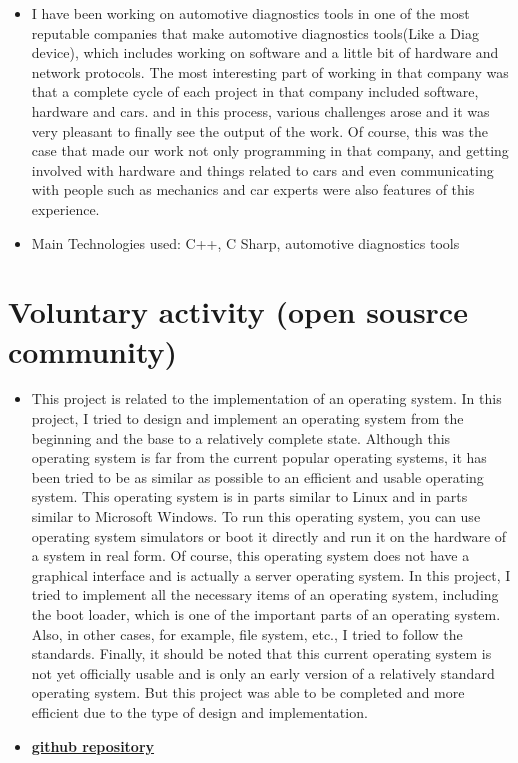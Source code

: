 \documentclass[11pt,a4paper,roman]{moderncv}
\begin{document}
{
{\begin{itemize}
  \item  I have been working on automotive diagnostics tools in one of the most reputable companies that make automotive diagnostics tools(Like a Diag device), which includes working on software and a little bit of hardware and network protocols.
  The most interesting part of working in that company was that a complete cycle of each project in that company included software, hardware and cars. and in this process, various challenges arose and it was very pleasant to finally see the output of the work.
Of course, this was the case that made our work not only programming in that company, and getting involved with hardware and things related to cars and even communicating with people such as mechanics and car experts were also features of this experience.
\item Main  Technologies used: C++, C Sharp, automotive diagnostics tools
\end{itemize}
}
}



\section{Voluntary activity (open sousrce community)}

{
{\begin{itemize}
  \item  This project is related to the implementation of an operating system.
  In this project, I tried to design and implement an operating system from the beginning and the base to a relatively complete state. Although this operating system is far from the current popular operating systems, it has been tried to be as similar as possible to an efficient and usable operating system.
  This operating system is in parts similar to Linux and in parts similar to Microsoft Windows.
  To run this operating system, you can use operating system simulators or boot it directly and run it on the hardware of a system in real form. Of course, this operating system does not have a graphical interface and is actually a server operating system.
  In this project, I tried to implement all the necessary items of an operating system, including the boot loader, which is one of the important parts of an operating system.
  Also, in other cases, for example, file system, etc., I tried to follow the standards.
  Finally, it should be noted that this current operating system is not yet officially usable and is only an early version of a relatively standard operating system.
  But this project was able to be completed and more efficient due to the type of design and implementation.
\item \href{https://github.com/YasinFaraji/famOS}{\textbf{github repository}}
\end{itemize}
}
}
\end{document}
